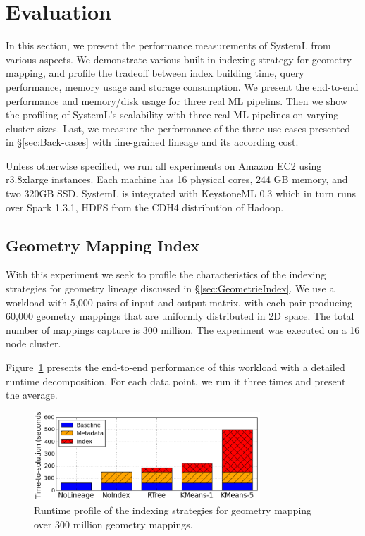 \documentclass{sig-alternate}
\begin{document}
\section{Evaluation}
\label{sec:Perf}
In this section, we present the performance measurements of SystemL from various aspects.
We demonstrate various built-in indexing strategy for geometry mapping, and profile the tradeoff
between index building time, query performance, memory usage and storage consumption.
We present the end-to-end performance and memory/disk usage for three real ML pipelins.
Then we show the profiling of SystemL's scalability with three real ML pipelines on varying cluster sizes.
Last, we measure the performance of the three use cases presented in \S\ref{sec:Back-cases} with 
fine-grained lineage and its according cost.

Unless otherwise specified, we run all experiments on Amazon EC2 using r3.8xlarge instances.
Each machine has 16 physical cores, 244 GB memory, and two 320GB SSD. 
SystemL is integrated with KeystoneML 0.3 which in turn runs over Spark 1.3.1, HDFS from the
CDH4 distribution of Hadoop. 

\subsection{Geometry Mapping Index}
\label{sec:Perf-Index}
With this experiment we seek to profile the characteristics of the indexing strategies for geometry lineage discussed in \S\ref{sec:GeometrieIndex}.
We use a workload with 5,000 pairs of input and output matrix, with each pair producing 60,000 geometry mappings that are uniformly distributed
in 2D space. The total number of mappings capture is 300 million. The experiment was executed on a 16 node cluster.

Figure~\ref{fig:sift-time} presents the end-to-end performance of this workload with a detailed runtime decomposition. For each data point, 
we run it three times and present the average. 

\begin{figure}[h]
\begin{center}
    \includegraphics[width=85mm]{pictures/SIFTIndex-Time}
\caption {Runtime profile of the indexing strategies for geometry mapping over 300 million geometry mappings.
    \label{fig:sift-time}
}
\end{center}
\end{figure}
\end{document}
